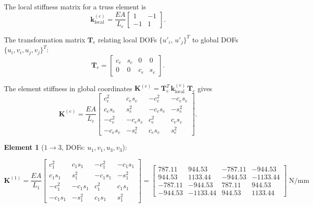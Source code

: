 \documentclass[11pt, a4paper]{article}
\begin{document}
The local stiffness matrix for a truss element is
\begin{equation}
\mathbf{k}^{(e)}_{\text{local}} = \frac{EA}{L_e}
\begin{bmatrix} 1 & -1 \\ -1 & 1 \end{bmatrix}.
\end{equation}

The transformation matrix $\mathbf{T}_e$ relating local DOFs $\{u'_i,\,u'_j\}^T$ to global DOFs $\{u_i, v_i, u_j, v_j\}^T$:
\begin{equation}
\mathbf{T}_e =
\begin{bmatrix} c_e & s_e & 0 & 0 \\ 0 & 0 & c_e & s_e \end{bmatrix}.
\end{equation}

The element stiffness in global coordinates $\mathbf{K}^{(e)}=\mathbf{T}_e^T\,\mathbf{k}^{(e)}_{\text{local}}\,\mathbf{T}_e$ gives
\begin{equation}\label{eq:Ke}
\mathbf{K}^{(e)} = \frac{EA}{L_e}
\begin{bmatrix}
 c_e^2   &  c_e s_e & -c_e^2   & -c_e s_e \\
 c_e s_e &  s_e^2   & -c_e s_e & -s_e^2   \\
-c_e^2   & -c_e s_e &  c_e^2   &  c_e s_e \\
-c_e s_e & -s_e^2   &  c_e s_e &  s_e^2
\end{bmatrix}.
\end{equation}

\noindent\textbf{Element 1} ($1\!\to\!3$, DOFs: $u_1,v_1,u_3,v_3$):

\begingroup\small
\setlength{\arraycolsep}{3pt}
\[
\mathbf{K}^{(1)} = \frac{EA}{L_1}
\begin{bmatrix}
c_1^2 & c_1 s_1 & -c_1^2 & -c_1 s_1 \\
c_1 s_1 & s_1^2 & -c_1 s_1 & -s_1^2 \\
-c_1^2 & -c_1 s_1 & c_1^2 & c_1 s_1 \\
-c_1 s_1 & -s_1^2 & c_1 s_1 & s_1^2
\end{bmatrix}
=
\begin{bmatrix}
 787.11 &   944.53 & -787.11 &  -944.53 \\
 944.53 &  1133.44 & -944.53 & -1133.44 \\
-787.11 &  -944.53 &  787.11 &   944.53 \\
-944.53 & -1133.44 &  944.53 &  1133.44
\end{bmatrix}\;\text{N/mm}
\]
\endgroup
\end{document}
